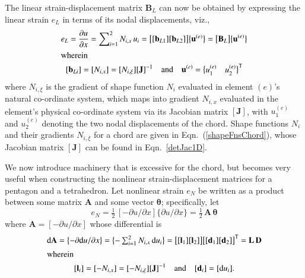 The linear strain-displacement matrix $\mathbf{B}_L$ can now be obtained by expressing the linear strain $e_L$ in terms of its nodal displacements, viz.,
\begin{subequations}
    \begin{gather}
    e_L  = \frac{\partial u}{\partial x}  =
    \sum\nolimits_{i=1}^2 N_{i,x} \, u_i = 
    \bigl[ 
    [\mathbf{b}_{L1}] [\mathbf{b}_{L2}]
    \bigr] \bigl\{ \begin{matrix} 
    \mathbf{u}^{(e)} 
    \end{matrix} \bigr\} 
    = \bigl[ \mathbf{B}_L \bigr] \bigl\{ \mathbf{u}^{(e)} \bigr\} \\
    \intertext{wherein} 
    [ \mathbf{b}_{Li} ] = [ N_{i,x} ] = [ N_{i,\xi} ] [ \mathbf{J} ]^{-1}
    \quad \text{and} \quad
    \mathbf{u}^{(e)}  = 
    \bigl\{ \begin{matrix}
    u^{(e)}_1 & u^{(e)}_2
    \end{matrix} \bigr\}^{\mathsf{T}}
    \end{gather}
\end{subequations}
where $N_{i,\xi}$ is the gradient of shape function $N_i$ evaluated in element $(e)$'s natural co-ordinate system, which maps into gradient $N_{i,x}$ evaluated in the element's physical co-ordinate system via its Jacobian matrix $[ \mathbf{J} ]$, with $u^{(e)}_1$ and $u^{(e)}_2$ denoting the two nodal displacements of the chord.  Shape functions $N_i$ and their gradients $N_{i,\xi}$ for a chord are given in Eqn.~(\ref{shapeFnsChord}), whose Jacobian matrix $[ \mathbf{J} ]$ can be found in Eqn.~\eqref{detJac1D}.

We now introduce machinery that is excessive for the chord, but becomes very useful when constructing the nonlinear strain-displacement matrices for a pentagon and a tetrahedron.  Let nonlinear strain $e_N$ be written as a product between some matrix $\mathbf{A}$ and some vector $\boldsymbol{\theta}$; specifically, let
\begin{equation}
e_ N =  \tfrac{1}{2} \,
[-\partial u / \partial x ]
\{\partial u / \partial x\}
= \tfrac{1}{2} \, \mathbf{A} \, \boldsymbol{\theta} 
\end{equation}
where $\mathbf{A} = [ -\partial u / \partial x ]$ whose differential is
\begin{subequations}
	\begin{gather}
	\mathrm{d} \mathbf{A} =  \bigl\{-
	\partial  \mathrm{d} u / \partial x
	\bigr\}
	= \bigl\{ \begin{matrix}
	- \sum\nolimits_{i=1}^2 N_{i,x} \,  \mathrm{d} u_i
	\end{matrix} \bigr\}
	= \bigl[ [\mathbf{l}_1] [\mathbf{l}_2] \bigr] \bigl[ [\mathbf{d}_1] [\mathbf{d}_2] \bigr]^{\mathsf{T}}
	= \mathbf{L} \, \mathbf{D}  \\
	\intertext{wherein}
	[\mathbf{l}_i] = [-N_{i,x}] = [-N_{i,\xi}] [ \mathbf{J}]^{-1} \quad \text{and} \quad  [\mathbf{d}_i] = [\mathrm{d} u_i] .
	\end{gather}
\end{subequations}

